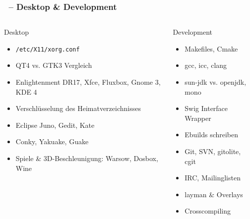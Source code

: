 \documentclass[utf8]{beamer}
\begin{document}
\begin{frame}
  \frametitle{\insertsectionhead\ -- Desktop \& Development}
  
\begin{columns}
\begin{block}{Desktop}
  \begin{itemize}
    \item \texttt{/etc/X11/xorg.conf}
    \item QT4 vs. GTK3 Vergleich
    \item Enlightenment DR17, Xfce, Fluxbox, Gnome 3, KDE 4
    \item Verschlüsselung des Heimatverzeichnisses
    \item Eclipse Juno, Gedit, Kate
    \item Conky, Yakuake, Guake
    \item Spiele \& 3D-Beschleunigung:
    Warsow, Dosbox, Wine
  \end{itemize}
\end{block}

\begin{block}{Development}
  \begin{itemize}
    \item Makefiles, Cmake
    \item gcc, icc, clang
    \item sun-jdk vs. openjdk, mono
    \item Swig Interface Wrapper
    \item Ebuilds schreiben
    \item Git, SVN, gitolite, cgit
    \item IRC, Mailinglisten
    \item layman \& Overlays
    \item Crosscompiling
    \vspace{0.5\baselineskip}
  \end{itemize}
\end{block}
\end{columns}
\end{frame}
\end{document}
